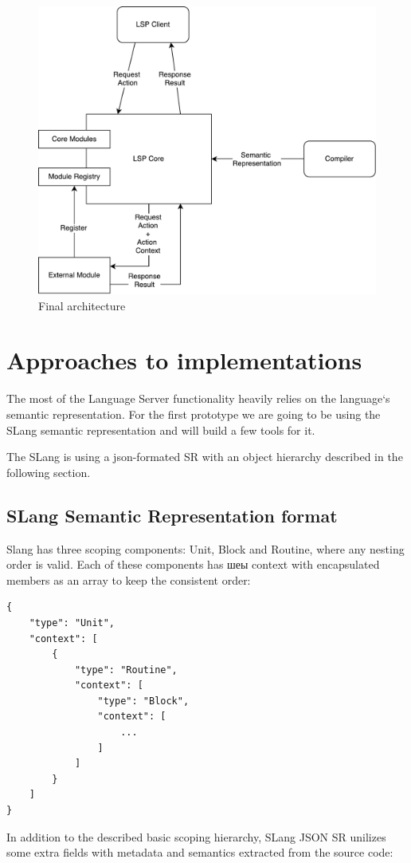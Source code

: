 \begin{figure}[H]
    \centering
    \includegraphics[width=.55\textwidth]{figs/ls_iteration_4.pdf}
    \caption{Final architecture}
    \label{fig:met:final_architecture}
\end{figure}

\newpage

\section{Approaches to implementations}

The most of the Language Server functionality heavily relies on the language`s semantic representation.
For the first prototype we are going to be using the SLang semantic representation and will build a few tools for it.

The SLang is using a json-formated SR with an object hierarchy described in the following section.

\subsection{SLang Semantic Representation format}

Slang has three scoping components: Unit, Block and Routine, where any nesting order is valid.
Each of these components has шеы context with encapsulated members as an array to
keep the consistent order:

\begin{lstlisting}
{
    "type": "Unit",
    "context": [
        {
            "type": "Routine",
            "context": [
                "type": "Block",
                "context": [
                    ...
                ]
            ]
        }
    ]
}
\end{lstlisting}

In addition to the described basic scoping hierarchy, SLang JSON SR unilizes some extra fields with
metadata and semantics extracted from the source code:


